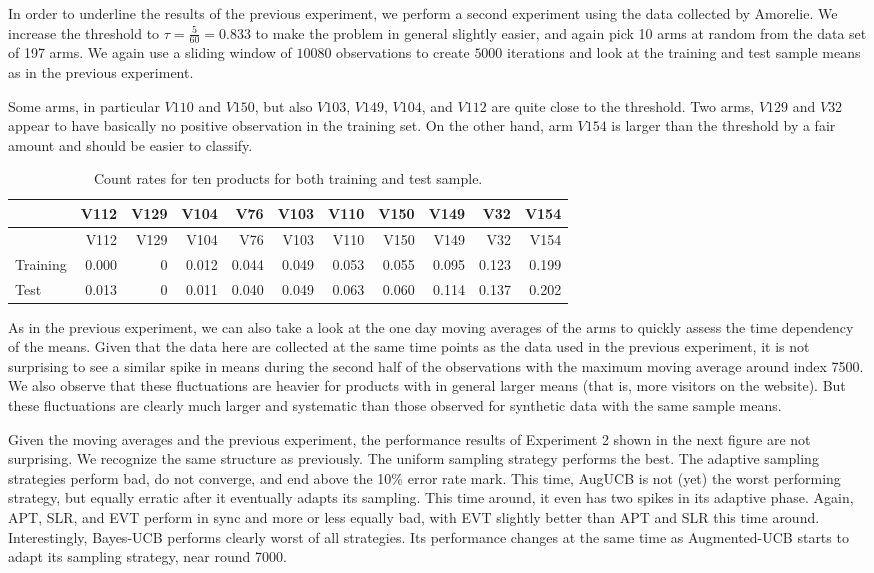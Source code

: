 \documentclass[11pt,]{article}
\begin{document}
In order to underline the results of the previous experiment, we perform
a second experiment using the data collected by Amorelie. We increase
the threshold to \(\tau = \frac{5}{60} = 0.833\) to make the problem in
general slightly easier, and again pick 10 arms at random from the data
set of 197 arms. We again use a sliding window of \(10080\) observations
to create \(5000\) iterations and look at the training and test sample
means as in the previous experiment.

Some arms, in particular \(V110\) and \(V150\), but also \(V103\),
\(V149\), \(V104\), and \(V112\) are quite close to the threshold. Two
arms, \(V129\) and \(V32\) appear to have basically no positive
observation in the training set. On the other hand, arm \(V154\) is
larger than the threshold by a fair amount and should be easier to
classify.

\begin{longtable}[]{@{}lrrrrrrrrrr@{}}
\caption{Count rates for ten products for both training and test
sample.}\tabularnewline
\toprule
& V112 & V129 & V104 & V76 & V103 & V110 & V150 & V149 & V32 &
V154\tabularnewline
\midrule
\endfirsthead
\toprule
& V112 & V129 & V104 & V76 & V103 & V110 & V150 & V149 & V32 &
V154\tabularnewline
\midrule
\endhead
Training & 0.000 & 0 & 0.012 & 0.044 & 0.049 & 0.053 & 0.055 & 0.095 &
0.123 & 0.199\tabularnewline
Test & 0.013 & 0 & 0.011 & 0.040 & 0.049 & 0.063 & 0.060 & 0.114 & 0.137
& 0.202\tabularnewline
\bottomrule
\end{longtable}

As in the previous experiment, we can also take a look at the one day
moving averages of the arms to quickly assess the time dependency of the
means. Given that the data here are collected at the same time points as
the data used in the previous experiment, it is not surprising to see a
similar spike in means during the second half of the observations with
the maximum moving average around index 7500. We also observe that these
fluctuations are heavier for products with in general larger means (that
is, more visitors on the website). But these fluctuations are clearly
much larger and systematic than those observed for synthetic data with
the same sample means.

Given the moving averages and the previous experiment, the performance
results of Experiment 2 shown in the next figure are not surprising. We
recognize the same structure as previously. The uniform sampling
strategy performs the best. The adaptive sampling strategies perform
bad, do not converge, and end above the 10\% error rate mark. This time,
AugUCB is not (yet) the worst performing strategy, but equally erratic
after it eventually adapts its sampling. This time around, it even has
two spikes in its adaptive phase. Again, APT, SLR, and EVT perform in
sync and more or less equally bad, with EVT slightly better than APT and
SLR this time around. Interestingly, Bayes-UCB performs clearly worst of
all strategies. Its performance changes at the same time as
Augmented-UCB starts to adapt its sampling strategy, near round 7000.
\end{document}
